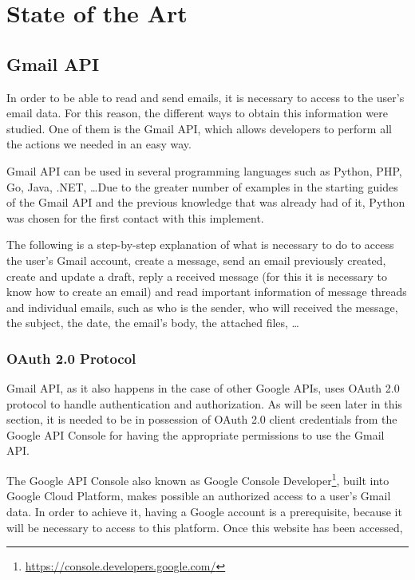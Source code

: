\chapter{State of the Art}
\label{cap:estadoDeLaCuestion}

\section{Gmail API}
In order to be able to read and send emails, it is necessary to access to the user's email data. For this reason, the different ways to obtain this information were studied. One of them is the Gmail API, which allows developers to perform all the actions we needed in an easy way.

Gmail API can be used in several programming languages such as Python, PHP, Go, Java, .NET, \ldots Due to the greater number of examples in the starting guides of the Gmail API \citep{gmailAPI} and the previous knowledge that was already had of it, Python was chosen for the first contact with this implement.

The following is a step-by-step explanation of what is necessary to do to access the user's Gmail account, create a message, send an email previously created, create and update a draft, reply a received message (for this it is necessary to know how to create an email) and read important information of message threads and individual emails, such as who is the sender, who will received the message, the subject, the date, the email's body, the attached files, \ldots

\subsection{OAuth 2.0 Protocol}
Gmail API, as it also happens in the case of other Google APIs, uses OAuth 2.0 protocol \citep{oauth} to handle authentication and authorization. As will be seen later in this section, it is needed to be in possession of OAuth 2.0 client credentials from the Google API Console for having the appropriate permissions to use the Gmail API.

The Google API Console also known as Google Console Developer\footnote{\url{https://console.developers.google.com/}}, built into Google Cloud Platform, makes possible an authorized access to a user's Gmail data. In order to achieve it, having a Google account is a prerequisite, because it will be necessary to access to this platform. Once this website has been accessed,

